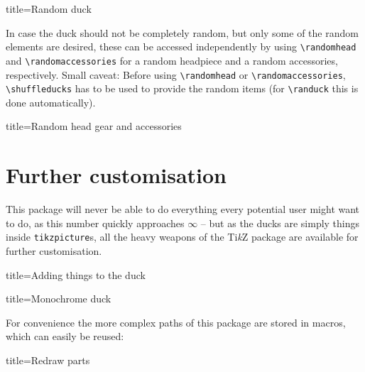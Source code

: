 \documentclass[parskip=half]{scrartcl}
\newcommand{\TikZ}{Ti\emph{k}Z\xspace}
\begin{document}
\begin{tcblisting}{title={Random duck}}
\begin{tikzpicture}
	\randuck
\end{tikzpicture}
\end{tcblisting}

In case the duck should not be completely random, but only some of the random elements are desired, these can be accessed independently by using \lstinline|\randomhead| and \lstinline|\randomaccessories| for a random headpiece and a random accessories, respectively. Small caveat: Before using \lstinline|\randomhead| or \lstinline|\randomaccessories|, \lstinline|\shuffleducks| has to be used to provide the random items (for \lstinline|\randuck| this is done automatically).     

\begin{tcblisting}{title={Random head gear and accessories}}
\begin{tikzpicture}
	\shuffleducks
	\duck[\randomhead, \randomaccessories]
\end{tikzpicture}
\end{tcblisting}

\section{Further customisation}

This package will never be able to do everything every potential user might want to do, as this number quickly approaches $\infty$ -- but as the ducks are simply things inside \lstinline|tikzpicture|s, all the heavy weapons of the \TikZ package are available for further customisation.

\begin{tcblisting}{title={Adding things to the duck}}
\end{tcblisting}

\begin{tcblisting}{title={Monochrome duck}}
\end{tcblisting}

For convenience the more complex paths of this package are stored in macros, which can easily be reused:

\begin{tcblisting}{title={Redraw parts}}
\begin{tikzpicture}
	\duck
	\path[preaction={fill, red!50!black},pattern=fivepointed stars, pattern color=yellow]  
			\duckpathlonghair;
\end{tikzpicture}
\end{tcblisting}
\end{document}
